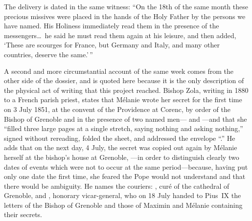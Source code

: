 The delivery is dated in the same witness: ``On the 18th of the same
month these precious missives were placed in the hands of the Holy
Father by the persons we have named. His Holiness immediately read
them in the presence of the messengers\ldots\ he said he must read
them again at his leisure, and then added, `These are scourges for
France, but Germany and Italy, and many other countries, deserve the
same.'\,''

A second and more circumstantial account of the same week comes from
the other side of the dossier, and is quoted here because it is the
only description of the physical act of writing that this project
reached. Bishop Zola, writing in 1880 to a French parish priest,
states that Mélanie wrote her secret for the first time on 3 July
1851, at the convent of the Providence at Corenc, by order of the
Bishop of Grenoble and in the presence of two named
men--- and
---and that
she ``filled three large pages at a single stretch, saying nothing
and asking nothing,'' signed without rereading, folded the sheet,
and addressed the envelope ``.''
He adds that on the next day, 4 July, the secret was copied out
again by Mélanie herself at the bishop's house at Grenoble,
---in order to distinguish
clearly two dates of events which were not to occur at the same
period---because, having put only one date the first time, she
feared the Pope would not understand and that there would be
ambiguity. He names the couriers: , curé of the
cathedral of Grenoble, and , honorary
vicar-general, who on 18 July handed to Pius~IX the letters of the
Bishop of Grenoble and those of Maximin and Mélanie containing their
secrets.

